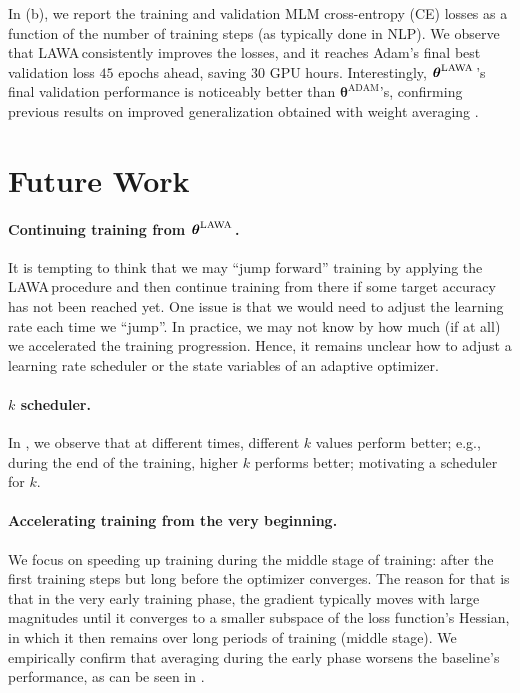 \documentclass{article}
\newcommand{\apr}{\raisebox{0.5ex}{\texttildelow}}
\newcommand{\params}{\boldsymbol{\theta}}
\newcommand{\method}{LAWA\,}
\newcommand{\lawasol}{\params^{\text{\method}}}
\begin{document}
In (b), we report the training and validation MLM cross-entropy (CE) losses as a function of the number of training steps (as typically done in NLP). We observe that \method consistently improves the losses, and it reaches Adam's final best validation loss \apr$45$ epochs ahead, saving \apr$30$ GPU hours. Interestingly, $\lawasol$'s final validation performance is noticeably better than $\params^{\text{ADAM}}$'s, confirming previous results on improved generalization obtained with weight averaging \cite{SWA,WASAM}. 

\section{Future Work} \label{sec:fw}


\paragraph{Continuing training from $\lawasol$.} 
It is tempting to think that we may ``jump forward'' training by applying the \method procedure and then continue training from there if some target accuracy has not been reached yet. One issue is that we would need to adjust the learning rate each time we ``jump''. In practice, we may not know by how much (if at all) we accelerated the training progression. Hence, it remains unclear how to adjust a learning rate scheduler or the state variables of an adaptive optimizer. 

\paragraph{$k$ scheduler.} In , we observe that at different times, different $k$ values perform better; e.g., during the end of the training, higher $k$ performs better; motivating a scheduler for $k$.

\paragraph{Accelerating training from the very beginning.} We focus on speeding up training during the middle stage of training: after the first training steps but long before the optimizer converges. The reason for that is that in the very early training phase, the gradient typically moves with large magnitudes until it converges to a smaller subspace of the loss function's Hessian, in which it then remains over long periods of training \cite{gur2018gradient,frankle2020early} (middle stage).  We empirically confirm that averaging during the early phase worsens the baseline's performance, as can be seen in . 
\end{document}
